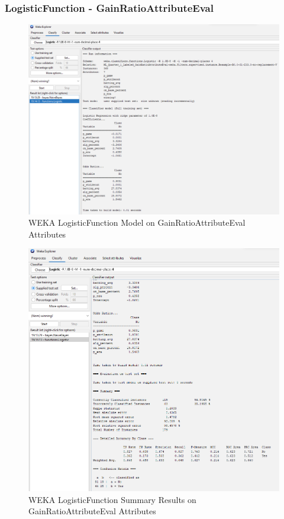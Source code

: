 \documentclass[12pt]{article}
\begin{document}
\newpage 
\subsubsection{LogisticFunction - GainRatioAttributeEval}
\begin{figure}[h!]
    \includegraphics[scale=0.4]{./images/GainRatioAttributeEval/LogisticFunction-Model.png}
\centering
    \caption{WEKA LogisticFunction Model on GainRatioAttributeEval Attributes}
\end{figure}
\newpage
\begin{figure}[h!]
    \includegraphics[scale=0.4]{./images/GainRatioAttributeEval/LogisticFunction-Summary.png}
\centering
    \caption{WEKA LogisticFunction Summary Results on GainRatioAttributeEval Attributes}
\end{figure}
\end{document}
